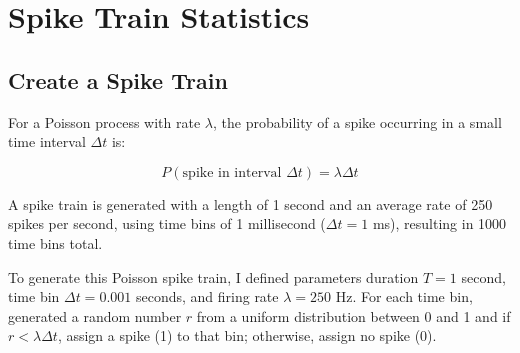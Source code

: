 \documentclass{article}
\begin{document}

\section{Spike Train Statistics}

\subsection{Create a Spike Train}

For a Poisson process with rate $\lambda$, the probability of a spike occurring in a small time interval $\Delta t$ is:

\begin{equation}
    P(\text{spike in interval } \Delta t) = \lambda \Delta t
\end{equation}

A spike train is generated with a length of 1 second and an average rate of 250 spikes per second, using time bins of 1 millisecond ($\Delta t = 1$ ms), resulting in 1000 time bins total.

To generate this Poisson spike train, I defined parameters duration $T = 1$ second, time bin $\Delta t = 0.001$ seconds, and firing rate $\lambda = 250$ Hz.
For each time bin, generated a random number $r$ from a uniform distribution between 0 and 1 and if $r < \lambda \Delta t$, assign a spike (1) to that bin; otherwise, assign no spike (0).
\end{document}
